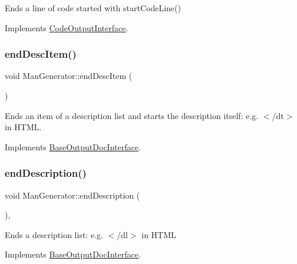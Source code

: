 Ends a line of code started with start\+Code\+Line() 

Implements \mbox{\hyperlink{class_code_output_interface_afac5763eafc78f93b82691fb9a6dcff7}{Code\+Output\+Interface}}.

\mbox{\label{class_man_generator_ab86f06d399e075e2b6855319bf26e1ec}} 
\subsubsection{\texorpdfstring{endDescItem()}{endDescItem()}}
{\footnotesize\ttfamily void Man\+Generator\+::end\+Desc\+Item (\begin{DoxyParamCaption}{ }\end{DoxyParamCaption})\hspace{0.3cm}{\ttfamily [virtual]}}

Ends an item of a description list and starts the description itself\+: e.\+g. {\ttfamily $<$/dt$>$} in H\+T\+ML. 

Implements \mbox{\hyperlink{class_base_output_doc_interface_a09e3aa9d3faac55b2cc9290eaa69f55b}{Base\+Output\+Doc\+Interface}}.

\mbox{\label{class_man_generator_a04db9176fd114182d5aab2a48346621d}} 
\subsubsection{\texorpdfstring{endDescription()}{endDescription()}}
{\footnotesize\ttfamily void Man\+Generator\+::end\+Description (\begin{DoxyParamCaption}{ }\end{DoxyParamCaption})\hspace{0.3cm}{\ttfamily [inline]}, {\ttfamily [virtual]}}

Ends a description list\+: e.\+g. {\ttfamily $<$/dl$>$} in H\+T\+ML 

Implements \mbox{\hyperlink{class_base_output_doc_interface_ac25c565e9fd8aee6c2b0d9b71fcff380}{Base\+Output\+Doc\+Interface}}.

\mbox{\label{class_man_generator_a3e158ae587148e66ad6f3d4df509ca35}} 
